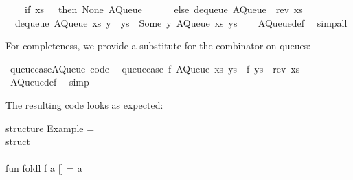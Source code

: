 \begin{isabellebody}
\ \ \ \ {\isacharparenleft}if\ xs\ {\isacharequal}\ {\isacharbrackleft}{\isacharbrackright}\ then\ {\isacharparenleft}None{\isacharcomma}\ AQueue\ {\isacharbrackleft}{\isacharbrackright}\ {\isacharbrackleft}{\isacharbrackright}{\isacharparenright}\isanewline
\ \ \ \ else\ dequeue\ {\isacharparenleft}AQueue\ {\isacharbrackleft}{\isacharbrackright}\ {\isacharparenleft}rev\ xs{\isacharparenright}{\isacharparenright}{\isacharparenright}{\isachardoublequoteclose}\isanewline
\ \ {\isachardoublequoteopen}dequeue\ {\isacharparenleft}AQueue\ xs\ {\isacharparenleft}y\ {\isacharhash}\ ys{\isacharparenright}{\isacharparenright}\ {\isacharequal}\ {\isacharparenleft}Some\ y{\isacharcomma}\ AQueue\ xs\ ys{\isacharparenright}{\isachardoublequoteclose}\isanewline
\ \ \isamarkupfalse%
\ AQueue{\isacharunderscore}def\ \isamarkupfalse%
\ simp{\isacharunderscore}all%
\endisatagquote
{\isafoldquote}%
%
\isadelimquote
%
\endisadelimquote
%
\begin{isamarkuptext}%
\noindent For completeness, we provide a substitute for the
   combinator on queues:%
\end{isamarkuptext}%
\isamarkuptrue%
%
\isadelimquote
%
\endisadelimquote
%
\isatagquote
{}\isamarkupfalse%
\ queue{\isacharunderscore}case{\isacharunderscore}AQueue\ {\isacharbrackleft}code{\isacharbrackright}{\isacharcolon}\isanewline
\ \ {\isachardoublequoteopen}queue{\isacharunderscore}case\ f\ {\isacharparenleft}AQueue\ xs\ ys{\isacharparenright}\ {\isacharequal}\ f\ {\isacharparenleft}ys\ {\isacharat}\ rev\ xs{\isacharparenright}{\isachardoublequoteclose}\isanewline
\ \ \isamarkupfalse%
\ AQueue{\isacharunderscore}def\ \isamarkupfalse%
\ simp%
\endisatagquote
{\isafoldquote}%
%
\isadelimquote
%
\endisadelimquote
%
\begin{isamarkuptext}%
\noindent The resulting code looks as expected:%
\end{isamarkuptext}%
\isamarkuptrue%
%
\isadelimquote
%
\endisadelimquote
%
\isatagquote
%
\begin{isamarkuptext}%
\isatypewriter%
\noindent%
\hspace*{0pt}structure Example = \\
\hspace*{0pt}struct\\
\hspace*{0pt}\\
\hspace*{0pt}fun foldl f a [] = a\\

\end{isamarkuptext}
\end{isabellebody}
